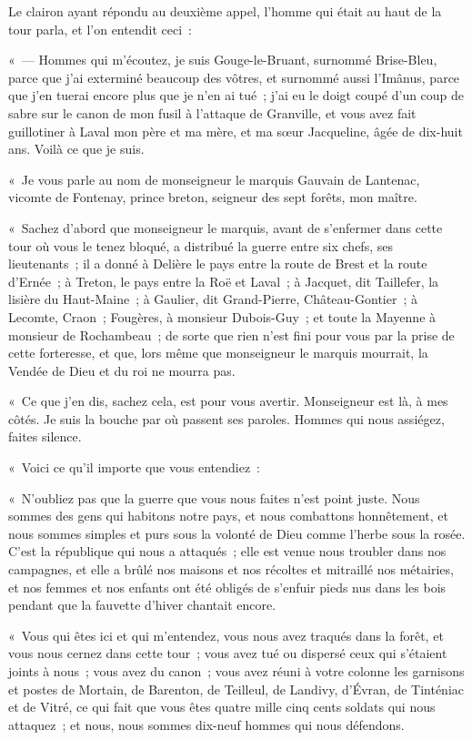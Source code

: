 \documentclass[french,twoside]{book} %
\begin{document}
Le clairon ayant répondu au deuxième appel, l’homme qui était au haut de la tour parla, et l’on entendit ceci :\par
« — Hommes qui m’écoutez, je suis Gouge-le-Bruant, surnommé Brise-Bleu, parce que j’ai exterminé beaucoup des vôtres, et surnommé aussi l’Imânus, parce que j’en tuerai encore plus que je n’en ai tué ; j’ai eu le doigt coupé d’un coup de sabre sur le canon de mon fusil à l’attaque de Granville, et vous avez fait guillotiner à Laval mon père et ma mère, et  ma sœur Jacqueline, âgée de dix-huit ans. Voilà ce que je suis.\par
« Je vous parle au nom de monseigneur le marquis Gauvain de Lantenac, vicomte de Fontenay, prince breton, seigneur des sept forêts, mon maître.\par
« Sachez d’abord que monseigneur le marquis, avant de s’enfermer dans cette tour où vous le tenez bloqué, a distribué la guerre entre six chefs, ses lieutenants ; il a donné à Delière le pays entre la route de Brest et la route d’Ernée ; à Treton, le pays entre la Roë et Laval ; à Jacquet, dit Taillefer, la lisière du Haut-Maine ; à Gaulier, dit Grand-Pierre, Château-Gontier ; à Lecomte, Craon ; Fougères, à monsieur Dubois-Guy ; et toute la Mayenne à monsieur de Rochambeau ; de sorte que rien n’est fini pour vous par la prise de cette forteresse, et que, lors même que monseigneur le marquis mourrait, la Vendée de Dieu et du roi ne mourra pas.\par
« Ce que j’en dis, sachez cela, est pour vous avertir. Monseigneur est là, à mes côtés. Je suis la bouche par où passent ses paroles. Hommes qui nous assiégez, faites silence.\par
« Voici ce qu’il importe que vous entendiez :\par
« N’oubliez pas que la guerre que vous nous faites n’est point juste. Nous sommes des gens qui habitons notre pays, et nous combattons honnêtement, et nous sommes simples et purs sous la volonté de Dieu comme l’herbe sous la rosée. C’est la république qui nous a attaqués ; elle est venue nous troubler dans nos campagnes, et elle a brûlé nos maisons et  nos récoltes et mitraillé nos métairies, et nos femmes et nos enfants ont été obligés de s’enfuir pieds nus dans les bois pendant que la fauvette d’hiver chantait encore.\par
« Vous qui êtes ici et qui m’entendez, vous nous avez traqués dans la forêt, et vous nous cernez dans cette tour ; vous avez tué ou dispersé ceux qui s’étaient joints à nous ; vous avez du canon ; vous avez réuni à votre colonne les garnisons et postes de Mortain, de Barenton, de Teilleul, de Landivy, d’Évran, de Tinténiac et de Vitré, ce qui fait que vous êtes quatre mille cinq cents soldats qui nous attaquez ; et nous, nous sommes dix-neuf hommes qui nous défendons.\par
\end{document}
